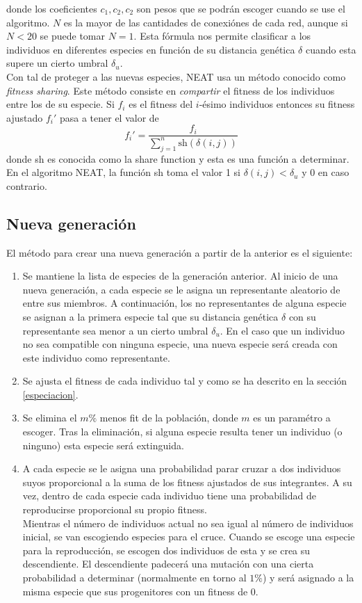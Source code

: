 \documentclass{article}
\begin{document}
donde los coeficientes $c_1,c_2,c_2 $ son pesos que se podrán escoger cuando se use el algoritmo. $N$ es la mayor de las cantidades de conexiónes de cada red, aunque si $N<20 $ se puede tomar $N=1$. Esta fórmula nos permite clasificar a los individuos en diferentes especies en función de su distancia genética $\delta$ cuando esta supere un cierto umbral $\delta_u$.\\

Con tal de proteger a las nuevas especies, NEAT usa un método conocido como \textit{fitness sharing}. Este método consiste en \textit{compartir} el fitness de los individuos entre los de su especie. Si $f_i$ es el fitness del $i$-ésimo individuos entonces su fitness ajustado $f_i'$ pasa a tener el valor de 
$$f_i'=\frac{f_i}{\sum_{j=1}^n \text{sh}(\delta(i,j))} $$
donde sh es conocida como la share function y esta es una función a determinar. En el algoritmo NEAT, la función sh toma el valor 1 si $\delta(i,j)<\delta_u $ y 0 en caso contrario.\\

\subsection{Nueva generación}
El método para crear una nueva generación a partir de la anterior es el siguiente:
\begin{enumerate}
\item Se mantiene la lista de especies de la generación anterior. Al inicio de una nueva generación, a cada especie se le asigna un representante aleatorio de entre sus miembros. A continuación, los no representantes de alguna especie se asignan a la primera especie tal que su distancia genética $\delta$ con su representante sea menor a un cierto umbral $\delta_u$. En el caso que un individuo no sea compatible con ninguna especie, una nueva especie será creada con este individuo como representante.
\item Se ajusta el fitness de cada individuo tal y como se ha descrito en la sección \ref{especiacion}.
\item Se elimina el $m\%$ menos fit de la población, donde $m$ es un paramétro a escoger. Tras la eliminación, si alguna especie resulta tener un individuo (o ninguno) esta especie será extinguida.
\item A cada especie se le asigna una probabilidad parar cruzar a dos individuos suyos proporcional a la suma de los fitness ajustados de sus integrantes. A su vez, dentro de cada especie cada individuo tiene una probabilidad de reproducirse proporcional su propio fitness.\\

Mientras el número de individuos actual no sea igual al número de individuos inicial, se van escogiendo especies para el cruce. Cuando se escoge una especie para la reproducción, se escogen dos individuos de esta y se crea su descendiente. El descendiente padecerá una mutación con una cierta probabilidad a determinar (normalmente en torno al $1\%$) y será asignado a la misma especie que sus progenitores con un fitness de 0.
\end{enumerate}
\end{document}
